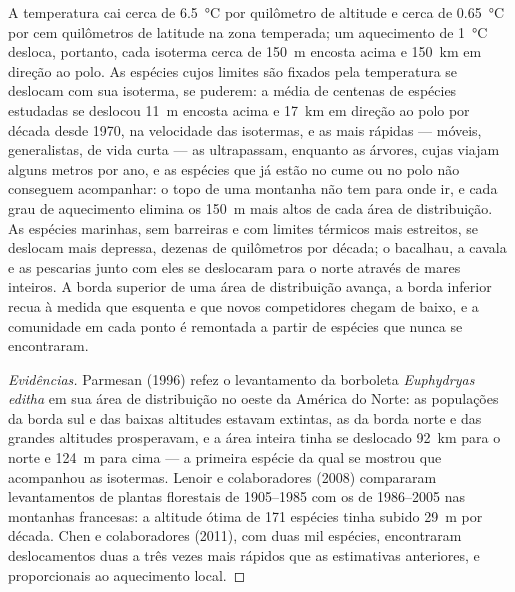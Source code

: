 \begin{proposition}\label{prop:b2:global-change:range}
A temperatura cai cerca de \qty{6.5}{\celsius} por quilômetro de
altitude e cerca de \qty{0.65}{\celsius} por cem quilômetros de latitude
na zona temperada; um aquecimento de \qty{1}{\celsius} desloca, portanto,
cada isoterma cerca de \qty{150}{m} encosta acima e
\qty{150}{km} em direção ao polo. As espécies cujos limites são fixados
pela temperatura se deslocam com sua isoterma, se puderem: a média de
centenas de espécies estudadas se deslocou \qty{11}{m} encosta acima e
\qty{17}{km} em direção ao polo por década desde 1970, na velocidade das
isotermas, e as mais rápidas --- móveis, generalistas, de vida curta ---
as ultrapassam, enquanto as árvores, cujas  viajam alguns metros
por ano, e as espécies que já estão no cume ou no polo não conseguem
acompanhar: o topo de uma montanha não tem para onde ir, e cada grau de
aquecimento elimina os \qty{150}{m} mais altos de cada área de
distribuição. As espécies marinhas, sem barreiras e com limites térmicos
mais estreitos, se deslocam mais depressa, dezenas de quilômetros por
década; o bacalhau, a cavala e as pescarias junto com eles se deslocaram
para o norte através de mares inteiros. A borda superior de uma área de
distribuição avança, a borda inferior recua à medida que esquenta e que
novos competidores chegam de baixo, e a comunidade em cada ponto é
remontada a partir de espécies que nunca se encontraram.
\end{proposition}
\begin{proof}[Evidências]
Parmesan (1996) refez o levantamento da borboleta \textit{Euphydryas
editha} em sua área de distribuição no oeste da América do Norte: as
populações da borda sul e das baixas altitudes estavam extintas, as da
borda norte e das grandes altitudes prosperavam, e a área inteira tinha
se deslocado \qty{92}{km} para o norte e \qty{124}{m} para cima --- a
primeira espécie da qual se mostrou que acompanhou as isotermas. Lenoir e
colaboradores (2008) compararam levantamentos de plantas florestais de
1905--1985 com os de 1986--2005 nas montanhas francesas: a altitude ótima
de 171 espécies tinha subido \qty{29}{m} por década. Chen e colaboradores
(2011), com duas mil espécies, encontraram deslocamentos duas a três
vezes mais rápidos que as estimativas anteriores, e proporcionais ao
aquecimento local.
\end{proof}

